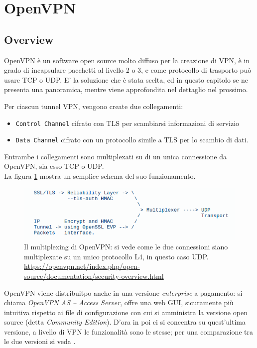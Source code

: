 \section{OpenVPN}
\subsection{Overview}
OpenVPN \cite{openvpn} è un software open source molto diffuso per la creazione di VPN,
è in grado di incapsulare pacchetti al livello 2 o 3, e come protocollo di trasporto
può usare TCP o UDP. E' la soluzione che è stata scelta, ed in questo capitolo
se ne presenta una panoramica, mentre viene approfondita nel dettaglio
nel prossimo.

Per ciascun tunnel VPN, vengono create due collegamenti:
\begin{itemize}
  \item \texttt{Control Channel} cifrato con TLS per scambiarsi informazioni di servizio
  \item \texttt{Data Channel} cifrato con un protocollo simile a TLS per lo scambio
  di dati.
\end{itemize}
Entrambe i collegamenti sono multiplexati su di un unica connessione
da OpenVPN, sia esso TCP o UDP\cite{openvpn-security}.\\
La figura \ref{fig:openvpn-sec} mostra un semplice schema del suo funzionamento.\\
\begin{figure}[h!]
  \includegraphics[scale=0.4]{img/openvpn_sec}
  \caption[Il multiplexing di OpenVPN]{Il multiplexing di OpenVPN: si vede come
  le due connessioni siano multiplexate su un unico protocollo L4, in questo caso UDP.
  \url{https://openvpn.net/index.php/open-source/documentation/security-overview.html}}
  \label{fig:openvpn-sec}
\end{figure}
OpenVPN viene distribuitpo anche in una versione \textit{enterprise} a pagamento: si chiama
\textit{OpenVPN AS -- Access Server}, offre una web GUI, sicuramente più intuitiva
rispetto ai file di configurazione con cui si amministra la versione open source
(detta \textit{Community Edition})\cite{openvpn-intro}. D'ora in poi ci si concentra su quest'ultima
versione, a livello di VPN le funzionalità sono le stesse; per una comparazione tra
le due versioni si veda
\cite{openvpn-comparison}.

